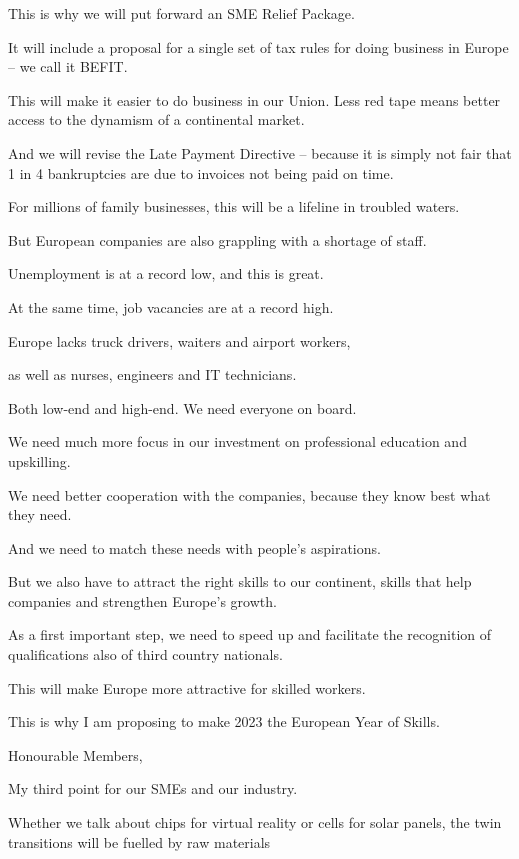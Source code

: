 \documentclass[a4paper,11pt]{article}
\begin{document}
This is why we will put forward an SME Relief Package.

It will include a proposal for a single set of tax rules for doing business in Europe – we call it BEFIT.

This will make it easier to do business in our Union. Less red tape means better access to the dynamism of a continental market.

And we will revise the Late Payment Directive – because it is simply not fair that 1 in 4 bankruptcies are due to invoices not being paid on time.

For millions of family businesses, this will be a lifeline in troubled waters.

 

But European companies are also grappling with a shortage of staff.

Unemployment is at a record low, and this is great.

At the same time, job vacancies are at a record high.

Europe lacks truck drivers, waiters and airport workers,

as well as nurses, engineers and IT technicians.

Both low-end and high-end. We need everyone on board.

We need much more focus in our investment on professional education and upskilling.

We need better cooperation with the companies, because they know best what they need.

And we need to match these needs with people's aspirations.

But we also have to attract the right skills to our continent, skills that help companies and strengthen Europe's growth.

As a first important step, we need to speed up and facilitate the recognition of qualifications also of third country nationals.

This will make Europe more attractive for skilled workers.

This is why I am proposing to make 2023 the European Year of Skills.

 

Honourable Members,

My third point for our SMEs and our industry.

Whether we talk about chips for virtual reality or cells for solar panels, the twin transitions will be fuelled by raw materials
\end{document}
